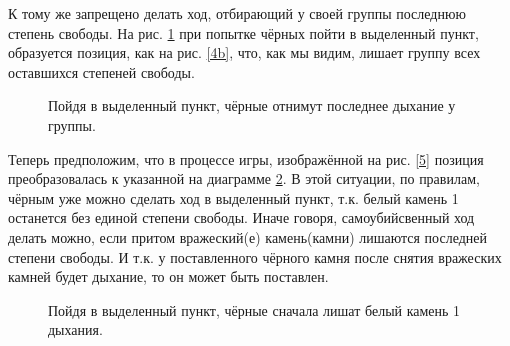 \documentclass[14pt,a4paper]{extarticle}
\newcommand{\stone}[3]{\filldraw[color=black, fill=#3, very thick](#1,#2) circle(0.45);}
\newcommand{\territory}[3]{\filldraw[color=black, fill=#3, very thick](#1, #2) circle(0.125);}
\newcommand{\stonelabel}[4]{\node[text=#3] at (#1,#2) {#4};}
\begin{document}
К тому же запрещено делать ход, отбирающий у своей группы последнюю степень свободы. На рис. \ref{6} при попытке чёрных пойти в выделенный пункт, образуется позиция, как на рис. \ref{4b}, что, как мы видим, лишает группу всех оставшихся степеней свободы.


\newpage


\begin{figure}[h!]
    \centering

    \caption{Пойдя в выделенный пункт, чёрные отнимут последнее дыхание у группы.}
    \label{6}
\end{figure}

Теперь предположим, что в процессе игры, изображённой на рис. \ref{5} позиция преобразовалась к указанной на диаграмме \ref{7}. В этой ситуации, по правилам, чёрным уже можно сделать ход в выделенный пункт, т.к. белый камень 1 останется без единой степени свободы. Иначе говоря, самоубийсвенный ход делать можно, если притом вражеский(е) камень(камни) лишаются последней степени свободы. И т.к. у поставленного чёрного камня после снятия вражеских камней будет дыхание, то он может быть поставлен.

\begin{figure}[h!]
    \centering
    \caption{Пойдя в выделенный пункт, чёрные сначала лишат белый камень 1 дыхания.}
    \label{7}
\end{figure}
\end{document}
